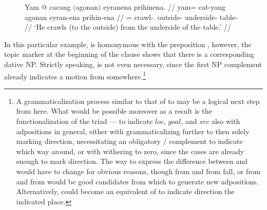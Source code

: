 \begin{figure}[h]
\ex\label{ex:nostackprep}\begingl
	\gla Yam @ cacang $($agonan$)$ eyranena prihinena. //
	\glb yam= cat-yang agonan eyran-ena prihin-ena //
	\glc \DatT{}= crawl-\TsgM{}.\Aarg{} outside-\Top{} underside-\Gen{}
		table-\Gen{} //
	\glft `He crawls (to the outside) from the underside of the table.' //
\endgl\xe
\end{figure}

In this particular example,  is homonymous with
the preposition , however, the topic marker at
the beginning of the clause shows that there is a corresponding dative NP.
Strictly speaking,  is not even necessary, since the first
NP complement already indicates a motion from somewhere.\footnote{A
grammaticalization process similar to that of  to
 may be a logical next step from here. What would be possible
moreover as a result is the functionalization of the triad
\Loc{}--\Dat{}--\Gen{} to indicate $loc$, $goal$, and $src$ also with
adpositions in general, either with  grammaticalizing further
to then solely marking direction, necessitating an obligatory \Dat{}/\Gen{}
complement to indicate which way around, or with  withering to
zero, since the cases are already enough to mark direction.
%
%
The way to express the difference between  and 
would have to change for obvious reasons, though  from 
 and  from 
{fall}, or  from  and
 from  would be good candidates
from which to generate new adpositions. Alternatively,  could
become an equivalent of  to indicate direction  the
indicated place.
%
%
}

